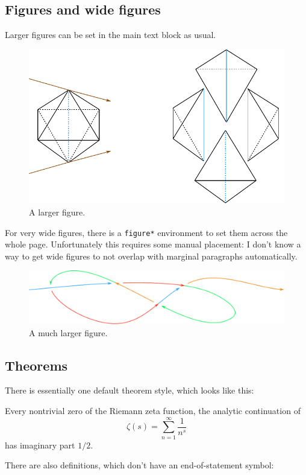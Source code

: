 \documentclass[margincite]{sl2art}
\begin{document}
\subsection{Figures and wide figures}
Larger figures can be set in the main text block as usual.
\begin{figure}
  \centering
  \includegraphics{fig-example.pdf}
  \caption{A larger figure.}%
  \label{fig:fig-example}
\end{figure}
For very wide figures, there is a \texttt{figure*} environment to set them across the whole page.
Unfortunately this requires some manual placement: I don't know a way to get wide figures to not overlap with marginal paragraphs automatically.
\begin{figure}
  \centering
  \includegraphics{wide-fig-example.pdf}
  \caption{A much larger figure.}%
  \label{fig:wide-fig-example}
\end{figure}

\subsection{Theorems}
There is essentially one default theorem style, which looks like this:
\begin{proposition}
  Every nontrivial zero of the Riemann zeta function, the analytic continuation of
  \[
    \zeta(s) = \sum_{n=1}^{\infty} \frac{1}{n^s}
  \]
  has imaginary part \(1/2\).
\end{proposition}
There are also definitions, which don't have an end-of-statement symbol:
\end{document}
